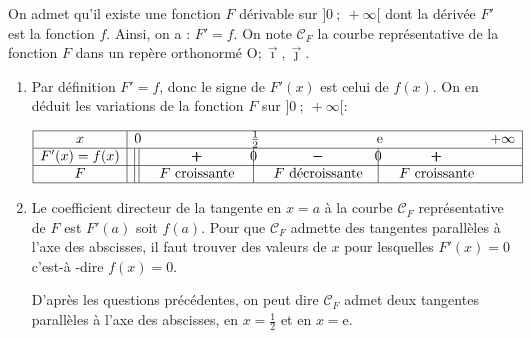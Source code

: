 \documentclass[10pt]{article}
\providecommand{\e}{{\mathrm{e}}}
\providecommand{\Oij}{\(\mathrm{O};\vec{\imath},\vec{\jmath}\)}
\begin{document}
\medskip

On admet qu'il existe une fonction $F$ dérivable sur $]0~;~+\infty[$ dont la dérivée $F'$ est la fonction $f$.
Ainsi, on a : $F' = f$.
On note $\mathcal{C}_F$ la courbe représentative de la fonction $F$ dans un repère orthonormé \Oij. 

\begin{enumerate}
\item 
Par définition $F'= f$, donc le signe de $F'(x)$ est celui de $f(x)$. On en déduit les variations de la fonction $F$ sur $]0~;~ +\infty[$:

\begin{center}
{
\renewcommand{\arraystretch}{1.5}
\def\esp{\hspace*{2cm}}
$\begin{array}{|c |l *{6}{c} |} 
\hline
x  & 0 & \esp & \frac{1}{2} & \esp & \e & \esp & +\infty \\
\hline
F'(x)=f(x) & \vline\;\vline\; & \pmb{+} &  \vline\hspace{-2.7pt}{0} & \pmb{-} & \vline\hspace{-2.7pt}{0} & \pmb{+} &\\
\hline
F & \vline\;\vline\; & F \text{ croissante} &  \vline\hspace{-2.7pt}{\phantom 0} & F \text{ décroissante} & \vline\hspace{-2.7pt}{\phantom 0} & F \text{ croissante} &\\
\hline
\end{array}$
}
\end{center}
\item Le coefficient directeur de la tangente en $x=a$ à  la courbe $\mathcal{C}_F$ représentative  de $F$ est $F'(a)$ soit $f(a)$. Pour que $\mathcal{C}_F$ admette des tangentes parallèles à l'axe des abscisses, il faut trouver des valeurs de $x$ pour lesquelles $F'(x)=0$ c'est-à -dire $f(x)=0$.

D'après les questions précédentes, on peut dire  $\mathcal{C}_F$ admet deux tangentes parallèles à  l'axe des abscisses, en $x=\frac{1}{2}$ et en $x=\e$.
\end{enumerate}
\end{document}
